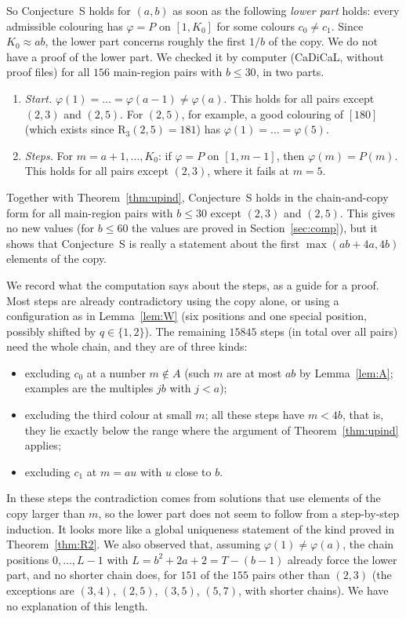 \documentclass[11pt,a4paper]{article}
\theoremstyle{definition}
\theoremstyle{remark}
\newcommand{\R}{\mathrm{R}}
\begin{document}
So Conjecture~S holds for $(a,b)$ as soon as the following \emph{lower part} holds: every admissible colouring has $\varphi=P$ on $[1,K_0]$ for some colours $c_0\ne c_1$. Since $K_0\approx ab$, the lower part concerns roughly the first $1/b$ of the copy. We do not have a proof of the lower part. We checked it by computer (CaDiCaL, without proof files) for all $156$ main-region pairs with $b\le30$, in two parts.
\begin{enumerate}[label=(\roman*)]
\item \emph{Start.} $\varphi(1)=\dots=\varphi(a-1)\ne\varphi(a)$. This holds for all pairs except $(2,3)$ and $(2,5)$. For $(2,5)$, for example, a good colouring of $[180]$ (which exists since $\R_3(2,5)=181$) has $\varphi(1)=\dots=\varphi(5)$.
\item \emph{Steps.} For $m=a+1,\dots,K_0$: if $\varphi=P$ on $[1,m-1]$, then $\varphi(m)=P(m)$. This holds for all pairs except $(2,3)$, where it fails at $m=5$.
\end{enumerate}
Together with Theorem~\ref{thm:upind}, Conjecture~S holds in the chain-and-copy form for all main-region pairs with $b\le30$ except $(2,3)$ and $(2,5)$. This gives no new values (for $b\le60$ the values are proved in Section~\ref{sec:comp}), but it shows that Conjecture~S is really a statement about the first $\max(ab+4a,4b)$ elements of the copy.

We record what the computation says about the steps, as a guide for a proof. Most steps are already contradictory using the copy alone, or using a configuration as in Lemma~\ref{lem:W} (six positions and one special position, possibly shifted by $q\in\{1,2\}$). The remaining $15845$ steps (in total over all pairs) need the whole chain, and they are of three kinds:
\begin{itemize}
\item excluding $c_0$ at a number $m\notin A$ (such $m$ are at most $ab$ by Lemma~\ref{lem:A}; examples are the multiples $jb$ with $j<a$);
\item excluding the third colour at small $m$; all these steps have $m<4b$, that is, they lie exactly below the range where the argument of Theorem~\ref{thm:upind} applies;
\item excluding $c_1$ at $m=au$ with $u$ close to $b$.
\end{itemize}
In these steps the contradiction comes from solutions that use elements of the copy larger than $m$, so the lower part does not seem to follow from a step-by-step induction. It looks more like a global uniqueness statement of the kind proved in Theorem~\ref{thm:R2}. We also observed that, assuming $\varphi(1)\ne\varphi(a)$, the chain positions $0,\dots,L-1$ with $L=b^2+2a+2=T-(b-1)$ already force the lower part, and no shorter chain does, for $151$ of the $155$ pairs other than $(2,3)$ (the exceptions are $(3,4)$, $(2,5)$, $(3,5)$, $(5,7)$, with shorter chains). We have no explanation of this length.
\end{document}
